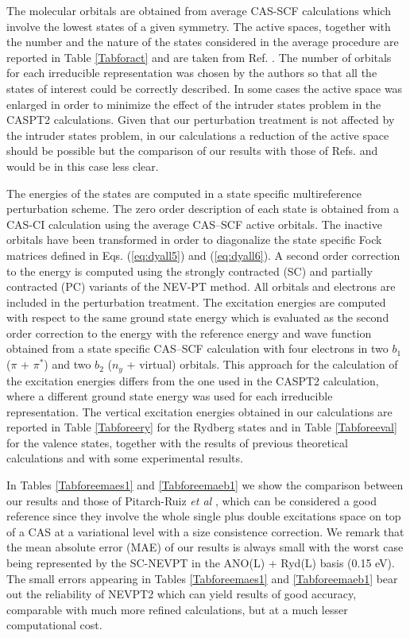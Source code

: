 \documentclass[global,referee]{svjour}
\begin{document}
The molecular orbitals are obtained from average CAS-SCF calculations which involve the lowest states
of a given symmetry. The active spaces, together with the number and the nature of the states 
considered in the average procedure are reported in Table \ref{Tabforact} and are taken from 
Ref. \cite{Merch95}.
The number of orbitals for each irreducible representation was chosen by the authors
so that all the states of interest could be correctly described.
In some cases the active space was enlarged in order to minimize the effect
of the intruder states problem in the CASPT2 calculations. 
Given that our perturbation treatment is not affected by the intruder states problem, 
in our calculations a reduction of the active space should be possible but the 
comparison of our results 
with those of Refs. \cite{Merch95} and \cite{Ruiz03} would be in this case less clear.




The energies of the states are computed in a state specific multireference perturbation scheme.
The zero order description of each state is obtained from a CAS-CI calculation using
the average CAS--SCF active orbitals. The inactive orbitals have been transformed 
in order to diagonalize the state specific Fock matrices defined in Eqs. (\ref{eq:dyall5})
and (\ref{eq:dyall6}).
A second order correction to the energy is computed using the strongly 
contracted (SC) and partially contracted (PC) variants of the NEV-PT method. All orbitals and electrons 
are included in the perturbation treatment. The excitation energies are computed with respect 
to the same ground state energy which is evaluated as the second order correction to the
energy with the reference energy and wave function obtained from a state specific 
CAS--SCF calculation with four electrons in two $b_1$ ($\pi$ + $\pi^*$) and two $b_2$
($n_y$ + virtual) orbitals.
This approach for the calculation of the excitation energies differs from the
one used in the CASPT2  \cite{Merch95} calculation, where a 
different ground state energy was used for each irreducible representation.
The vertical excitation energies obtained in our calculations are 
reported in Table \ref{Tabforeery}
for the Rydberg states and in Table \ref{Tabforeeval} for the valence states, together with 
the results of previous theoretical calculations and with some experimental results.





In Tables \ref{Tabforeemaes1} and  \ref{Tabforeemaeb1} we show the comparison between our results and
those of Pitarch-Ruiz {\it et al} \cite{Ruiz03}, which can be considered a good reference since they 
involve the whole single plus double excitations space on top of a CAS at a variational level with a size 
consistence correction. We remark that the mean absolute error (MAE) of our results is always 
small with the worst case being represented by the SC-NEVPT in the ANO(L) + Ryd(L) basis (0.15 eV).
The small errors appearing in Tables \ref{Tabforeemaes1} and  \ref{Tabforeemaeb1} bear out the
reliability of NEVPT2 which can yield results of good accuracy, comparable with much more refined calculations, but at a much
lesser computational cost.
\end{document}

